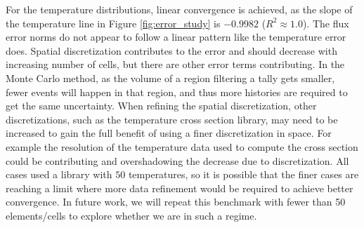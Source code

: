 \documentclass[letterpaper]{mc2023}
\begin{document}
For the temperature distributions, linear convergence is achieved, as the slope of the temperature line in Figure \ref{fig:error_study} is
$-0.9982$ ($R^2\approx1.0$). The flux error norms do not appear to follow a linear pattern like the temperature error does. Spatial discretization
contributes to the error and should decrease with increasing number of cells, but there are other error terms contributing. In the Monte Carlo
method, as the volume of a region filtering a tally gets smaller, fewer events will happen in that region, and thus more histories are required
to get the same uncertainty. When refining the spatial discretization, other discretizations, such as the temperature cross section library,
may need to be increased to gain the full benefit of using a finer discretization in space. For example the resolution of the temperature data
used to compute the cross section could be contributing and overshadowing the decrease due to discretization. All cases used a library with $50$
temperatures, so it is possible that the finer cases are reaching a limit where more data refinement would be required to achieve better
convergence. In future work, we will repeat this benchmark with fewer than 50 elements/cells to explore whether we are in such a regime.
\end{document}
